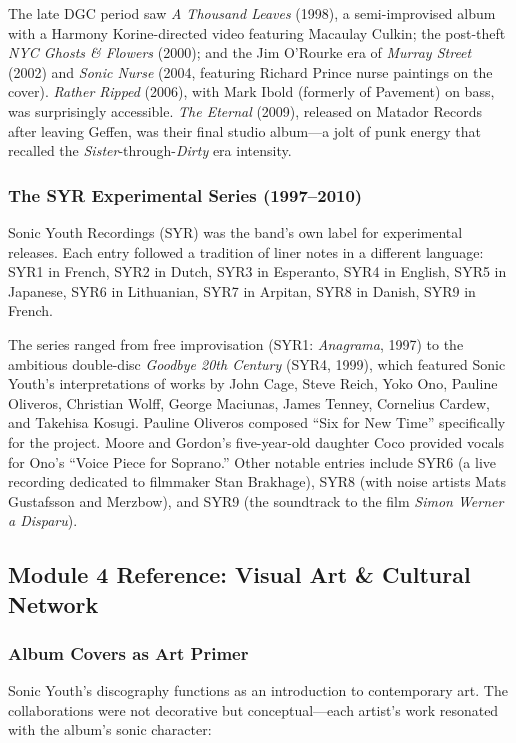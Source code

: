 \documentclass[11pt,letterpaper]{article}
\begin{document}
The late DGC period saw \textit{A Thousand Leaves} (1998), a semi-improvised album with a Harmony Korine-directed video featuring Macaulay Culkin; the post-theft \textit{NYC Ghosts \& Flowers} (2000); and the Jim O'Rourke era of \textit{Murray Street} (2002) and \textit{Sonic Nurse} (2004, featuring Richard Prince nurse paintings on the cover). \textit{Rather Ripped} (2006), with Mark Ibold (formerly of Pavement) on bass, was surprisingly accessible. \textit{The Eternal} (2009), released on Matador Records after leaving Geffen, was their final studio album---a jolt of punk energy that recalled the \textit{Sister}-through-\textit{Dirty} era intensity.

\subsubsection{The SYR Experimental Series (1997--2010)}

Sonic Youth Recordings (SYR) was the band's own label for experimental releases. Each entry followed a tradition of liner notes in a different language: SYR1 in French, SYR2 in Dutch, SYR3 in Esperanto, SYR4 in English, SYR5 in Japanese, SYR6 in Lithuanian, SYR7 in Arpitan, SYR8 in Danish, SYR9 in French.

The series ranged from free improvisation (SYR1: \textit{Anagrama}, 1997) to the ambitious double-disc \textit{Goodbye 20th Century} (SYR4, 1999), which featured Sonic Youth's interpretations of works by John Cage, Steve Reich, Yoko Ono, Pauline Oliveros, Christian Wolff, George Maciunas, James Tenney, Cornelius Cardew, and Takehisa Kosugi. Pauline Oliveros composed ``Six for New Time'' specifically for the project. Moore and Gordon's five-year-old daughter Coco provided vocals for Ono's ``Voice Piece for Soprano.'' Other notable entries include SYR6 (a live recording dedicated to filmmaker Stan Brakhage), SYR8 (with noise artists Mats Gustafsson and Merzbow), and SYR9 (the soundtrack to the film \textit{Simon Werner a Disparu}).

\subsection{Module 4 Reference: Visual Art \& Cultural Network}

\subsubsection{Album Covers as Art Primer}

Sonic Youth's discography functions as an introduction to contemporary art. The collaborations were not decorative but conceptual---each artist's work resonated with the album's sonic character:
\end{document}
